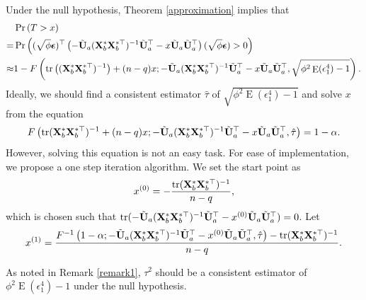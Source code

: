 \documentclass[bj]{imsart}
\DeclareMathOperator{\mytr}{tr}
\DeclareMathOperator{\myE}{E}
\theoremstyle{plain}
\theoremstyle{definition}
\theoremstyle{remark}
\begin{document}
Under the null hypothesis, Theorem \ref{approximation} implies that
\begin{equation*}
    \begin{split}
    &\Pr\left( 
        T> x 
    \right) 
    \\
    =&
    \Pr\left( 
        (\sqrt \phi \bepsilon)^\top 
        \left( 
        -\tilde{\BU}_a ( \BX_b^* \BX_b^{*\top} )^{-1} \tilde{\BU}_a^\top 
   -x\tilde{\BU}_a \tilde{\BU}_a^\top
        \right)
        (\sqrt \phi \bepsilon)
        > 0
    \right) 
    \\
    \approx& 
    1- F\left(
   \mytr\left( (\BX_b^* \BX_b^{*\top})^{-1} \right)
   +(n-q)x
        ;-\tilde{\BU}_a ( \BX_b^* \BX_b^{*\top} )^{-1} \tilde{\BU}_a^\top 
   -x\tilde{\BU}_a \tilde{\BU}_a^\top
,\sqrt{\phi^2 \myE (\epsilon_1^4) -1}\right)
.
    \end{split}
\end{equation*}
Ideally, we should find a consistent estimator $\hat \tau$ of $\sqrt{\phi^2 \myE (\epsilon_1^4) -1}$ and solve $x$ from the equation
\begin{equation*}
     F\left(
   \mytr (\BX_b^* \BX_b^{*\top})^{-1} 
   +(n-q)x
        ;-\tilde{\BU}_a ( \BX_b^* \BX_b^{*\top} )^{-1} \tilde{\BU}_a^\top 
   -x\tilde{\BU}_a \tilde{\BU}_a^\top
,\hat \tau\right)
=1-\alpha.
\end{equation*}
However, solving this equation is not an easy task.
For ease of implementation, we propose a one step iteration algorithm.
We set the start point as
\begin{equation*}
    x^{(0)} =  -\frac{\mytr ( \BX_b^* \BX_b^{*\top} )^{-1}}{n-q},
\end{equation*}
which is chosen such that $\mytr( -\tilde{\BU}_a ( \BX_b^* \BX_b^{*\top} )^{-1} \tilde{\BU}_a^\top 
-x^{(0)}\tilde{\BU}_a \tilde{\BU}_a^\top )=0$.
Let
\begin{equation*}
    x^{(1)}= 
        \frac{
            F^{-1}\left(1-\alpha;-\tilde{\BU}_a ( \BX_b^* \BX_b^{*\top} )^{-1} \tilde{\BU}_a^\top 
                -x^{(0)}\tilde{\BU}_a \tilde{\BU}_a^\top
,\hat \tau\right)
-
   \mytr (\BX_b^* \BX_b^{*\top})^{-1} 
   }{n-q}
.
\end{equation*}

        As noted in Remark \ref{remark1}, $\tau^2$ should be a consistent estimator of $\phi^2 \myE (\epsilon_1^4)-1$ under the null hypothesis.
\end{document}
